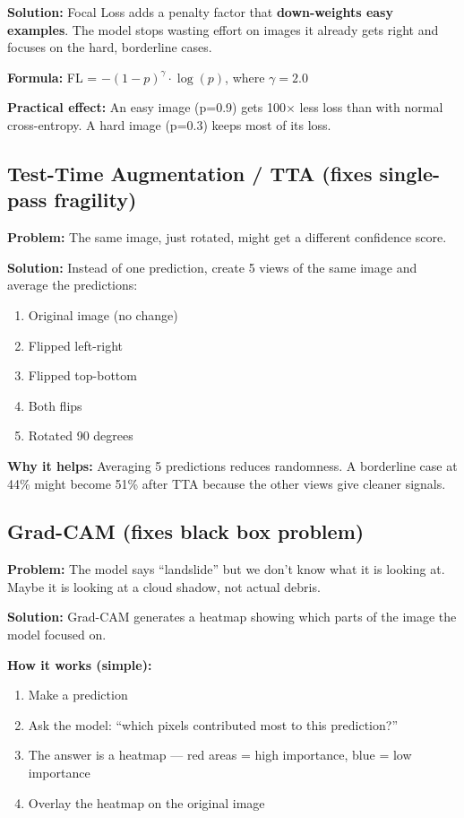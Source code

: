 \documentclass[11pt]{article}
\begin{document}
\textbf{Solution:} Focal Loss adds a penalty factor that \textbf{down-weights easy examples}. The model stops wasting effort on images it already gets right and focuses on the hard, borderline cases.

\textbf{Formula:} FL = $-(1-p)^\gamma \cdot \log(p)$, where $\gamma = 2.0$

\textbf{Practical effect:} An easy image (p=0.9) gets 100$\times$ less loss than with normal cross-entropy. A hard image (p=0.3) keeps most of its loss.

\subsection{Test-Time Augmentation / TTA (fixes single-pass fragility)}

\textbf{Problem:} The same image, just rotated, might get a different confidence score.

\textbf{Solution:} Instead of one prediction, create 5 views of the same image and average the predictions:
\begin{enumerate}[noitemsep]
    \item Original image (no change)
    \item Flipped left-right
    \item Flipped top-bottom
    \item Both flips
    \item Rotated 90 degrees
\end{enumerate}

\textbf{Why it helps:} Averaging 5 predictions reduces randomness. A borderline case at 44\% might become 51\% after TTA because the other views give cleaner signals.

\subsection{Grad-CAM (fixes black box problem)}

\textbf{Problem:} The model says ``landslide'' but we don't know what it is looking at. Maybe it is looking at a cloud shadow, not actual debris.

\textbf{Solution:} Grad-CAM generates a heatmap showing which parts of the image the model focused on.

\textbf{How it works (simple):}
\begin{enumerate}[noitemsep]
    \item Make a prediction
    \item Ask the model: ``which pixels contributed most to this prediction?''
    \item The answer is a heatmap --- red areas = high importance, blue = low importance
    \item Overlay the heatmap on the original image
\end{enumerate}
\end{document}
